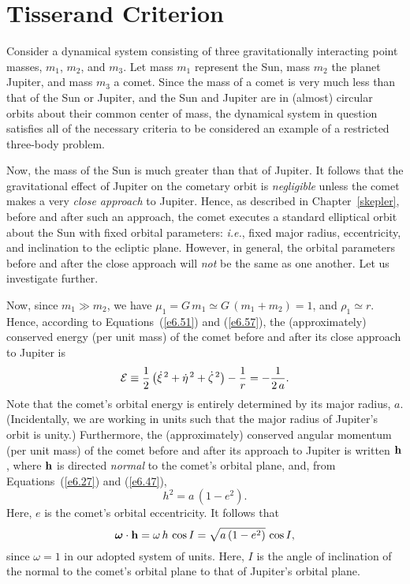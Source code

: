 \section{Tisserand Criterion}
Consider a dynamical system consisting of three gravitationally
interacting point masses, $m_1$, $m_2$, and $m_3$. Let mass $m_1$ represent the Sun, mass $m_2$ the planet Jupiter, and mass $m_3$ a comet. Since the
mass of a comet is very much less than that of the Sun or Jupiter, and  the Sun and Jupiter
are in (almost) circular orbits about their common center of mass, the dynamical system in question satisfies
all of the necessary criteria to be considered an example of a restricted three-body problem. 

Now, the mass of the Sun is much greater than that of Jupiter. It follows that the gravitational
effect of Jupiter on the cometary orbit is {\em negligible}\/ unless the comet makes a very {\em close
approach}\/ to Jupiter. Hence, as described in Chapter~\ref{skepler}, before and after such an approach,  the comet executes a
standard elliptical orbit about the Sun with fixed orbital parameters: {\em i.e.}, fixed major radius, eccentricity, and
inclination to the ecliptic plane. However, in general, the orbital parameters before  and after the close approach will {\em not}\/ be the same
as one another. Let us investigate further.

Now, since $m_1\gg m_2$, we have $\mu_1=G\,m_1\simeq G\,(m_1+m_2)=1$, and $\rho_1\simeq r$.
Hence, according to Equations~(\ref{e6.51}) and (\ref{e6.57}), the (approximately) conserved
energy (per unit mass) of the comet before and after its close approach to Jupiter is
\begin{equation}\label{e14.16}
{\cal E} \equiv \frac{1}{2}\left(\dot{\xi}^{\,2}+\dot{\eta}^{\,2} + \dot{\zeta}^{\,2}\right) - \frac{1}{r} = - \frac{1}{2\,a}.
\end{equation}
Note that the comet's orbital energy is entirely determined by its major radius, $a$. (Incidentally, we are working
in units such that the major radius of Jupiter's orbit is unity.) Furthermore, the (approximately) conserved
angular momentum (per unit mass) of the comet before and after its approach to Jupiter
is written ${\bf h}$, where ${\bf h}$ is directed {\em normal}\/ to the comet's orbital plane,
and, from Equations~(\ref{e6.27}) and (\ref{e6.47}),
\begin{equation}
h^2 = a\,(1-e^2).
\end{equation}
Here, $e$ is the comet's orbital eccentricity. It follows that
\begin{equation}\label{e14.17}
\mbox{\boldmath$\omega$}\cdot {\bf h} = \omega\,h\,\cos I = \sqrt{a\,(1-e^2)}\,\cos I,
\end{equation}
since $\omega=1$ in our adopted system of units. Here, $I$ is the angle of
inclination of the normal to the comet's orbital plane to that of Jupiter's orbital
plane.

